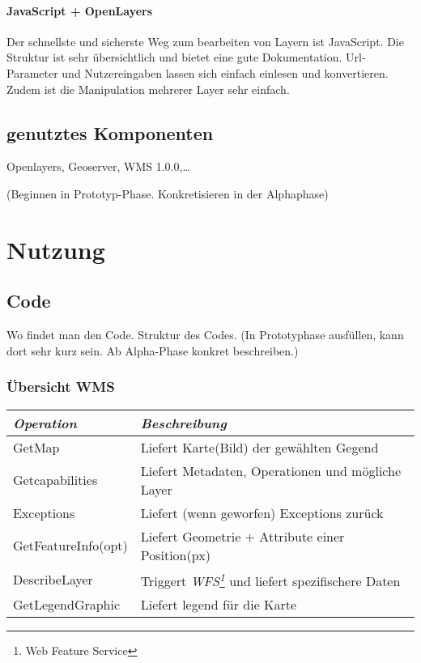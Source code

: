 \paragraph{JavaScript + OpenLayers}
Der schnellste und sicherste Weg zum bearbeiten von Layern ist JavaScript. Die Struktur ist sehr \"ubersichtlich und bietet eine gute Dokumentation. Url-Parameter und Nutzereingaben lassen sich einfach einlesen und konvertieren. Zudem ist die Manipulation mehrerer Layer sehr einfach. 

\subsection{genutztes Komponenten}
Openlayers, Geoserver, WMS 1.0.0,\ldots

(Beginnen in Prototyp-Phase. Konkretisieren in der Alphaphase)

\section{Nutzung}

\subsection{Code}
Wo findet man den Code. Struktur des Codes. (In Prototyphase ausfüllen,
kann dort sehr kurz sein. Ab Alpha-Phase konkret beschreiben.)
\subsubsection{\"Ubersicht WMS}
\begin{tabular}{ll}
\emph{Operation} & \emph{Beschreibung} \\
\hline 
GetMap & Liefert Karte(Bild) der gew\"ahlten Gegend \\ 
\hline 
Getcapabilities & Liefert Metadaten, Operationen und m\"ogliche Layer \\ 
\hline 
Exceptions & Liefert (wenn geworfen) Exceptions zur\"uck \\ 
\hline 
GetFeatureInfo(opt) & Liefert Geometrie + Attribute einer Position(px) \\ 
\hline 
DescribeLayer & Triggert \emph{WFS\footnote{Web Feature Service}} und liefert spezifischere Daten \\ 
\hline 
GetLegendGraphic & Liefert legend f\"ur die Karte \\ 
\hline 
\end{tabular} 
